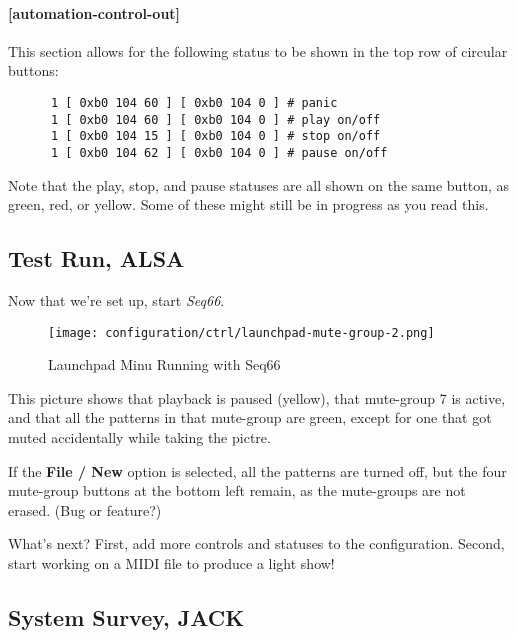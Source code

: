 \paragraph{[automation-control-out]}
\label{paragraph:patterns_automation_control_out}

   This section allows for the following status to be shown in the top row of
   circular buttons:

   \begin{verbatim}
      1 [ 0xb0 104 60 ] [ 0xb0 104 0 ] # panic
      1 [ 0xb0 104 60 ] [ 0xb0 104 0 ] # play on/off
      1 [ 0xb0 104 15 ] [ 0xb0 104 0 ] # stop on/off
      1 [ 0xb0 104 62 ] [ 0xb0 104 0 ] # pause on/off
   \end{verbatim}

   Note that the play, stop, and pause statuses are all shown on the same
   button, as green, red, or yellow.  Some of these might still be in progress
   as you read this.

\subsection{Test Run, ALSA}
\label{subsubsec:launchpad_mini_test_run_alsa}

   Now that we're set up, start \textsl{Seq66}.

\begin{figure}[H]
   \centering 
   \texttt{[image: configuration/ctrl/launchpad-mute-group-2.png]}
   \caption{Launchpad Minu Running with Seq66}
   \label{fig:launchpad_mute_group_perspective}
\end{figure}

   This picture shows that playback is paused (yellow), that mute-group 7 is
   active, and that all the patterns in that mute-group are green, except for
   one that got muted accidentally while taking the pictre.

   If the \textbf{File / New} option is selected, all the patterns are turned
   off, but the four mute-group buttons at the bottom left remain, as the
   mute-groups are not erased.  (Bug or feature?)

   What's next?  First, add more controls and statuses to the configuration.
   Second, start working on a MIDI file to produce a light show!

\subsection{System Survey, JACK}
\label{subsec:launchpad_mini_survey_jack}

